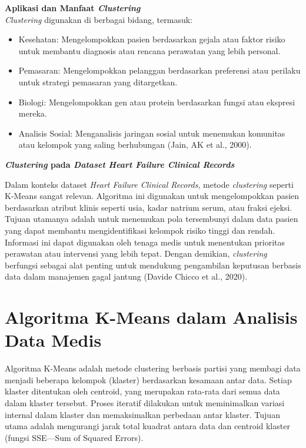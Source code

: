 \documentclass[english,12pt,a4paper,openany]{book}
\begin{document}
	\textbf{Aplikasi dan Manfaat \textit{Clustering}}\\
	
	\textit{Clustering} digunakan di berbagai bidang, termasuk:
	\begin{itemize}
		\item Kesehatan: Mengelompokkan pasien berdasarkan gejala atau faktor risiko untuk membantu diagnosis atau rencana perawatan yang lebih personal.
		\item Pemasaran: Mengelompokkan pelanggan berdasarkan preferensi atau perilaku untuk strategi pemasaran yang ditargetkan.
		\item Biologi: Mengelompokkan gen atau protein berdasarkan fungsi atau ekspresi mereka.
		\item Analisis Sosial: Menganalisis jaringan sosial untuk menemukan komunitas atau kelompok yang saling berhubungan (Jain, AK et al., 2000).
	\end{itemize}
	
	\textbf{\textit{Clustering} pada \textit{Dataset Heart Failure Clinical Records}}
	
	Dalam konteks dataset \textit{Heart Failure Clinical Records}, metode \textit{clustering} seperti K-Means sangat relevan. Algoritma ini digunakan untuk mengelompokkan pasien berdasarkan atribut klinis seperti usia, kadar natrium serum, atau fraksi ejeksi. Tujuan utamanya adalah untuk menemukan pola tersembunyi dalam data pasien yang dapat membantu mengidentifikasi kelompok risiko tinggi dan rendah. Informasi ini dapat digunakan oleh tenaga medis untuk menentukan prioritas perawatan atau intervensi yang lebih tepat. Dengan demikian, \textit{clustering} berfungsi sebagai alat penting untuk mendukung pengambilan keputusan berbasis data dalam manajemen gagal jantung (Davide Chicco et al., 2020).
	
	
	\section{Algoritma K-Means dalam Analisis Data Medis}
	
	Algoritma K-Means adalah metode clustering berbasis partisi yang membagi data menjadi beberapa kelompok (klaster) berdasarkan kesamaan antar data. Setiap klaster ditentukan oleh centroid, yang merupakan rata-rata dari semua data dalam klaster tersebut. Proses iteratif dilakukan untuk meminimalkan variasi internal dalam klaster dan memaksimalkan perbedaan antar klaster. Tujuan utama adalah mengurangi jarak total kuadrat antara data dan centroid klaster (fungsi SSE—Sum of Squared Errors).\\
	
\end{document}
